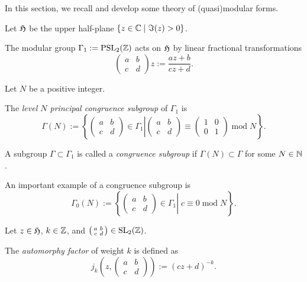 
In this section, we recall and develop some theory of (quasi)modular forms.

Let $\mathfrak{H}$ be the upper half-plane $\{z\in\mathbb{C}\mid\Im(z)>0\}$.
\begin{lemma}\label{def-Gamma-1-Action}
    The modular group $\Gamma_1:=\mathrm{PSL}_2(\mathbb{Z})$ acts on $\mathfrak{H}$ by linear fractional transformations
$$\left(\begin{smallmatrix}a&b\\c&d\end{smallmatrix}\right)z:=\frac{az+b}{cz+d}.$$
\end{lemma}

Let $N$ be a positive integer.
\begin{definition}\label{def-level-N-princ-cong-subgp}
    The \emph{level $N$ principal congruence subgroup} of $\Gamma_1$ is
    $$\Gamma(N):=\left\{\left.\left(\begin{smallmatrix}a&b\\c&d\end{smallmatrix}\right)\in\Gamma_1\right|\left(\begin{smallmatrix}a&b\\c&d\end{smallmatrix}\right)\equiv\left(\begin{smallmatrix}1&0\\0&1\end{smallmatrix}\right)\;\mathrm{mod}\;N\right\}.$$
\end{definition}

\begin{definition}\label{def-congruence-subgroup}
    A subgroup $\Gamma\subset\Gamma_1$ is called a \emph{congruence subgroup} if $\Gamma(N)\subset\Gamma$ for some $N\in\mathbb{N}$.
\end{definition}

An important example of a congruence subgroup is
$$\Gamma_0(N):=\left\{\left.\left(\begin{smallmatrix}a&b\\c&d\end{smallmatrix}\right)\in\Gamma_1\right|\;c\equiv0\;\mathrm{mod}\;N\right\}.$$

Let $z\in\mathfrak{H}$, $k\in\mathbb{Z}$, and $\left(\begin{smallmatrix}a&b\\c&d\end{smallmatrix}\right)\in\mathrm{SL}_2(\mathbb{Z})$.
\begin{definition}\label{def-automorphy-factor}
    The \emph{automorphy factor} of weight $k$ is defined as
$$j_k(z,\left(\begin{smallmatrix}a&b\\c&d\end{smallmatrix}\right)):=(cz+d)^{-k}.$$
\end{definition}


